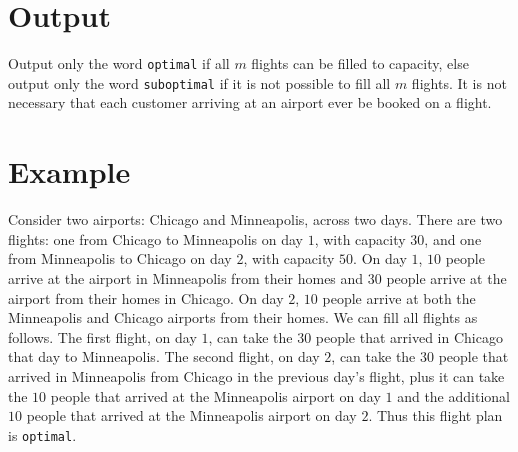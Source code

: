 \section*{Output}

Output only the word \texttt{optimal} if all $m$ flights can be filled to capacity,
else output only the word \texttt{suboptimal} if it is not possible to fill all $m$
flights. It is not necessary that each customer arriving at an airport ever be booked
on a flight.

\section*{Example}

Consider two airports: Chicago and Minneapolis, across two days. There are
two flights: one from Chicago to Minneapolis on day $1$, with capacity $30$, and one from Minneapolis
to Chicago on day $2$, with capacity $50$. On day $1$, $10$ people arrive at the airport
in Minneapolis from their homes and $30$ people arrive at the airport from their homes in Chicago. 
On day $2$, $10$ people arrive at both the Minneapolis and Chicago airports from their homes.
We can fill all flights as follows.
The first flight, on day $1$, can take the $30$ people that arrived in Chicago that day to
Minneapolis. The second flight, on day $2$, can take the $30$ people that arrived in Minneapolis
from Chicago in the previous day's flight, plus it can take the $10$ people that arrived at the
Minneapolis airport on day $1$ and the additional $10$ people that arrived at the Minneapolis airport
on day $2$. Thus this flight plan is \texttt{optimal}.
